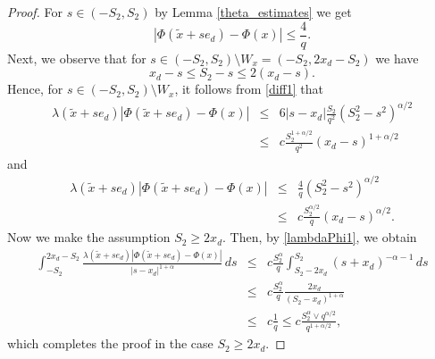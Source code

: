 \documentclass[10pt,a4paper]{amsart}
\begin{document}
\begin{proof}
For $s \in (-S_2,S_2)$ by Lemma \ref{theta_estimates} we get
\begin{equation*} \label{diff3}
\left| \varPhi(\tilde{x} + s e_d) - \varPhi(x) \right| 
\le  \frac{4}{q }.
\end{equation*}
Next, we observe that for $s\in (-S_2,S_2)\setminus W_x= (-S_2, 2x_d-S_2)$ we have 
$$x_d-s\le S_2-s\le 2(x_d-s). $$
Hence, for $s\in(-S_2,S_2)\setminus W_x$, it follows from \eqref{diff1} that
\begin{eqnarray}
\lambda(\tilde{x} + s e_d) |\varPhi(\tilde{x} + s e_d) - \varPhi(x)|&\le& 6 |s-x_d| \frac{S_2}{q^{2} }(S^2_2-s^2)^{\alpha/2}\nonumber\\
&\le& c \frac{S^{1+\alpha/2}_2}{q^{2} }(x_d-s)^{1+\alpha/2}\label{lambdaPhi}\end{eqnarray}
and
\begin{eqnarray}
\lambda(\tilde{x} + s e_d) |\varPhi(\tilde{x} + s e_d) - \varPhi(x)|&\le&\frac{4}{q }(S^2_2-s^2)^{\alpha/2}\nonumber\\
&\le&c \frac{S^{\alpha/2}_2}{q }(x_d-s)^{\alpha/2}.\label{lambdaPhi1}
\end{eqnarray}
Now we make the assumption $S_2\ge 2x_d$. Then, by \eqref{lambdaPhi1}, we obtain
\begin{eqnarray*}
\int_{-S_2}^{2x_d-S_2} 
\frac{\lambda(\tilde{x} + s e_d) |\varPhi(\tilde{x} + s e_d) - \varPhi(x)|}{|s - x_d|^{1 + \alpha}} \, ds 
&\le&  c\frac{S^{\alpha}_2}{q }\int_{S_2- 2x_d}^{S_2} (s+x_d)^{-\alpha-1}\, ds\\
&\le& c\frac{S^{\alpha}_2}{q }\frac {2x_d} {(S_2- x_d)^{1+\alpha}} \\
&\le& c\frac{1}{q } 
\le c\frac{S^{\alpha}_2\vee q^{\alpha/2}}{q^{1+\alpha/2} }, 
\end{eqnarray*}
which completes the proof in the case $S_2\ge 2x_d$. 


\end{proof}
\end{document}
